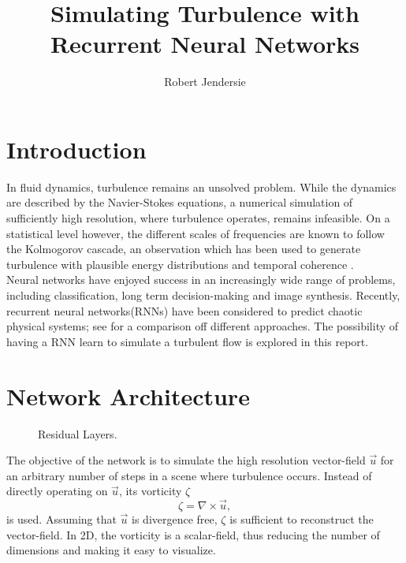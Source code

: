 \documentclass[sigconf]{acmart}
\newcommand{\curl}[1]{{\nabla} \times #1} %
\begin{document}
\title{Simulating Turbulence with Recurrent Neural Networks }
\subtitle{}

\author{Robert Jendersie}

\maketitle

\section{Introduction}
In fluid dynamics, turbulence remains an unsolved problem. While the dynamics are described by the Navier-Stokes equations, a numerical simulation of sufficiently high resolution, where turbulence operates, remains infeasible. On a statistical level however, the different scales of frequencies are known to follow the Kolmogorov cascade, an observation which has been used to generate turbulence with plausible energy distributions and temporal coherence \cite{kim2008wavelet}. \\
Neural networks have enjoyed success in an increasingly wide range of problems, including classification, long term decision-making and image synthesis.
Recently, recurrent neural networks(RNNs) have been considered to predict chaotic physical systems; see \cite{vlachas2019forecasting} for a comparison off different approaches.
The possibility of having a RNN learn to simulate a turbulent flow is explored in this report.
\section{Network Architecture}
\begin{figure}
\caption{Residual Layers.}
\label{residualLayers}
\end{figure}
The objective of the network is to simulate the high resolution vector-field $\vec{u}$ for an arbitrary number of steps in a scene where turbulence occurs.
Instead of directly operating on $\vec{u}$, its vorticity $\zeta$
\[
\zeta = \curl{\vec{u}},
\]
is used. Assuming that $\vec{u}$ is divergence free, $\zeta$ is sufficient to reconstruct the vector-field. In 2D, the vorticity is a scalar-field, thus reducing the number of dimensions and making it easy to visualize.
\end{document}
